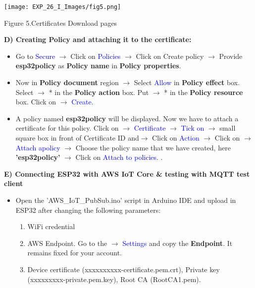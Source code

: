\documentclass[12pt,a4paper]{article}
\begin{document}
\begin{justify}
\begin{itemize}
\begin{center} 
\texttt{[image: EXP\_26\_I\_Images/fig5.png]}
\end{center}
\vspace{-10mm}
\begin{center} {Figure 5.Certificates Download pages}\end{center}
\end{itemize}


\textbf{D)	Creating Policy and attaching it to the certificate:}
\vspace{-3mm}
\begin{itemize}
 \setlength\itemsep{-0.3em}
\item  	Go to \textcolor{blue}{Secure} $ \rightarrow $ Click on \textcolor{blue}{Policies} $ \rightarrow $ Click on Create policy $ \rightarrow $ Provide \textbf{esp32policy} as \textbf{Policy name} in \textbf{Policy properties}. 

\item Now in \textbf{Policy document} region $ \rightarrow $ Select \textcolor{blue}{Allow} in \textbf{Policy effect} box. Select $ \rightarrow $ *  in the \textbf{Policy action} box. Put $ \rightarrow $  * in the \textbf{Policy resource} box. Click on $ \rightarrow $ \textcolor{blue}{Create}.

\item A policy named \textbf{esp32policy} will be displayed. Now we have to attach a certificate for this policy. Click on $ \rightarrow $ \textcolor{blue}{Certificate} $ \rightarrow $ \textcolor{blue}{Tick on} $ \rightarrow $ small square box in front of Certificate ID and$ \rightarrow $ Click on \textcolor{blue}{Action} $ \rightarrow $ Click on $ \rightarrow $  \textcolor{blue}{Attach apolicy} $ \rightarrow $  Choose the policy name that we have created, here \textbf{'esp32policy'} $ \rightarrow $ Click on \textcolor{blue}{Attach to policies}.
.
\end{itemize}

\vspace{3cm}

\textbf{E) Connecting  ESP32 with AWS IoT Core \& testing with MQTT test client }
\vspace{-3mm}
\begin{itemize}
 \setlength\itemsep{-0.3em}
\item Open the 'AWS\_IoT\_PubSub.ino' script in Arduino IDE and upload in ESP32 after  changing the following parameters:

    \begin{enumerate}
     \setlength\itemsep{-0.3em}
    \item WiFi credential
    \item AWS Endpoint. Go to the $ \rightarrow $ \textcolor{blue}{Settings} and copy the \textbf{Endpoint}. It remains fixed for your account.
    \item Device certificate (xxxxxxxxxx-certificate.pem.crt), Private key (xxxxxxxxx-private.pem.key), Root CA (RootCA1.pem). 
    

\end{enumerate}
\end{itemize}
\end{justify}
\end{document}
